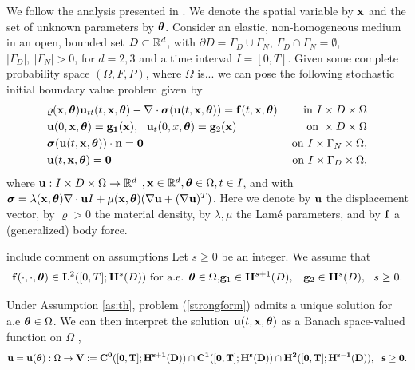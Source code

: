 We follow the analysis presented  in \cite{ motamed2013stochastic, motamed2015analysis,kocher2014variational,joly2003variational}. We denote the spatial variable by $\mathbf{x}$ and the set of unknown parameters by $\bm{\theta}$. Consider an elastic,  non-homogeneous medium in an open, bounded set  $D\subset \mathbb{R}^d$, with $\partial D=\Gamma_D\cup \Gamma_N$, $\Gamma_D\cap \Gamma_N=\emptyset$, $|\Gamma_D|,\ |\Gamma_N|>0$, for $d=2,3$ and a time interval $I=[0,T]$. Given some complete probability space $(\Omega,F,P)$, \color{red} where $\Omega$ is...\color{black} we can pose the following stochastic initial boundary value problem given by \begin{subequations}\label{strongform}
	\begin{align}
	&\varrho(\xx,\te)\uu_{tt}(t,\xx,\te)-\del\cdot\mathbf{\sig}(\uu(t,\xx,\te))=\ff(t,\xx,\te) & \text{in } I\times D\times \Omega\\
	&\uu(0,\xx,\te)=\mathbf{g_1}(\xx), \ \ \uu_t(0,x,\te)=\mathbf{g}_2(\xx) & \text{on } \times D\times \Omega\\
	&\sig(\uu(t,\xx,\te))\cdot\mathbf{n}=\mathbf{0}& \text{on }I\times\Gamma_N\times \Omega,\\
	&\uu(t,\xx,\te)=\bm{0}&\text{ on } I\times\Gamma_D\times \Omega,
	\end{align}
\end{subequations}
where  $\mathbf{u}: I\times D\times\Omega  \rightarrow\mathbb{R}^d$ $,\mathbf{x}\in \mathbb{R}^d,\bm{\theta}\in\Omega, t\in I$, and with  $\bm{\sigma}=\lambda(\mathbf{x},\bm{\theta})\nabla\cdot\mathbf{u} I +\mu(\mathbf{x},\bm{\theta})(\nabla\mathbf{u}+(\nabla\mathbf{u})^T)$. Here we denote by $\mathbf{u}$  the displacement vector, by $\varrho>0$ the material density, by $\lambda,\mu$ the Lam\'e parameters,  and by $\mathbf{f}$ a (generalized) body force. \begin{assumption}\label{as:th} \color{red} include comment on assumptions\color{black}
	Let $s\geq 0$ be an integer. We assume that \begin{eqnarray}
	\mathbf{f}(\cdot,\cdot,\bm{\theta})\in\mathbf{L}^2([0,T];\mathbf{H}^s(D))\text{ for a.e. $\bm{\theta}\in \Omega$}, & \mathbf{g}_1\in \mathbf{H}^{s+1}(D), &\mathbf{g}_2\in \mathbf{H}^s(D), \ \ s\geq 0.
	\end{eqnarray}
\end{assumption}
\noindent Under Assumption \ref{as:th}, problem (\ref{strongform}) admits a unique solution for a.e $\bm{\theta} \in \Omega$. We can then interpret the solution $\mathbf{u}(t,\mathbf{x},\bm{\theta})$ as a Banach space-valued function on $\Omega$  \cite{motamed2015analysis}, \begin{equation}\label{eq:wf_s}
\mathbf{u}=\mathbf{u}(\bm{\theta}):\Omega\rightarrow\bf{V}:=\mathbf{C}^0([0,T];\mathbf{H}^{s+1}(D))\cap\mathbf{C}^1([0,T];\mathbf{H}^s(D))\cap\mathbf{H}^{2}([0,T];\mathbf{H}^{s-1}(D)), \ \ s\geq 0.
\end{equation}
